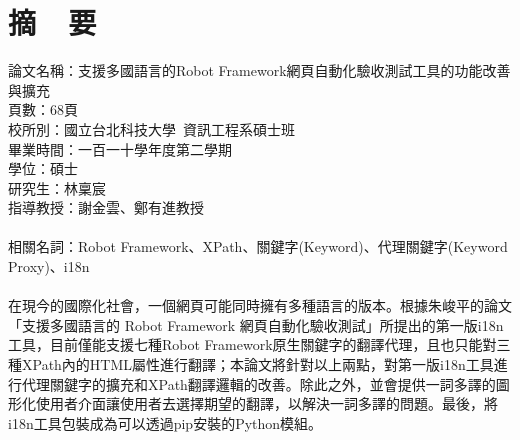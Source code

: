 \chapter*{摘~~要}


\noindent
論文名稱：支援多國語言的Robot Framework網頁自動化驗收測試工具的功能改善與擴充\\
頁數：68頁\\
校所別：國立台北科技大學~資訊工程系碩士班\\
畢業時間：一百一十學年度第二學期\\
學位：碩士\\
研究生：林稟宸\\
指導教授：謝金雲、鄭有進教授\\
\hspace*{\fill}\\
\noindent
相關名詞：Robot Framework、XPath、關鍵字(Keyword)、代理關鍵字(Keyword Proxy)、i18n\\
\hspace*{\fill}\\
%
\indent
在現今的國際化社會，一個網頁可能同時擁有多種語言的版本。根據朱峻平的論文「支援多國語言的 Robot Framework 網頁自動化驗收測試」所提出的第一版i18n工具，目前僅能支援七種Robot Framework原生關鍵字的翻譯代理，且也只能對三種XPath內的HTML屬性進行翻譯；本論文將針對以上兩點，對第一版i18n工具進行代理關鍵字的擴充和XPath翻譯邏輯的改善。除此之外，並會提供一詞多譯的圖形化使用者介面讓使用者去選擇期望的翻譯，以解決一詞多譯的問題。最後，將i18n工具包裝成為可以透過pip安裝的Python模組。
